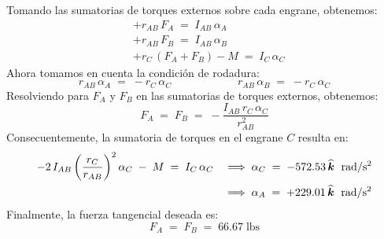\documentclass[ a4paper, twoside, 11pt]{article}
\begin{document}
\begin{problem}
Tomando las sumatorias de torques externos sobre cada engrane, obtenemos:
\begin{align*}
& +r_{AB} \, F_A \; = \; I_{AB} \, \alpha_A \\
& +r_{AB} \, F_B \; = \; I_{AB} \, \alpha_B \\
& + r_C \, ( F_A + F_B ) - M \; = \; I_C \, \alpha_C
\end{align*}
Ahora tomamos en cuenta la condici\'on de rodadura: 
\[
r_{AB} \, \alpha_A \; = \; -r_C \, \alpha_C \qquad \qquad \qquad
r_{AB} \, \alpha_B \; = \; -r_C \, \alpha_C
\]
Resolviendo para $F_A$ y $F_B$ en las sumatorias de torques externos, obtenemos: 
\[
F_A \; = \; F_B \; = \; -\frac{ I_{AB} \, r_C \, \alpha_C }{r_{AB}^2}
\]
Consecuentemente, la sumatoria de torques en el engrane $C$ resulta en:
\begin{align*}
-2 \, I_{AB} \left( \frac{r_C}{r_{AB}} \right)^2 \alpha_C \; - \; M
\; = \; I_C \, \alpha_C \quad
& \Longrightarrow \;
\alpha_C \; = \; -572.53 \, {\boldsymbol{\widehat{k}}} \; \text{ rad/s\ensuremath{^{\text{2}}}} \\
& \Longrightarrow \;
\alpha_A \; = \; +229.01 \, {\boldsymbol{\widehat{k}}} \; \text{ rad/s\ensuremath{^{\text{2}}}}
\end{align*}
Finalmente, la fuerza tangencial deseada es: 
\[
F_A \; = \; F_B \; = \; 66.67 \; \text{lbs}
\]
\QED

\end{problem}
\fullskip
\end{document}
